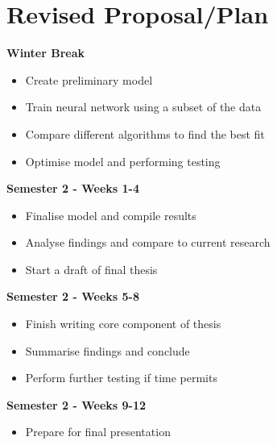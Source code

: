 \documentclass[12pt,twocolumn]{article}
\begin{document}
	\section{Revised Proposal/Plan}
		\textbf{Winter Break}
		\begin{itemize}
			\item Create preliminary model
			\item Train neural network using a subset of the data
			\item Compare different algorithms to find the best fit
			\item Optimise model and performing testing
		\end{itemize}
		\textbf{Semester 2 - Weeks 1-4}
		\begin{itemize}
			\item Finalise model and compile results
			\item Analyse findings and compare to current research
			\item Start a draft of final thesis
		\end{itemize}
		\textbf{Semester 2 - Weeks 5-8}
		\begin{itemize}
			\item Finish writing core component of thesis
			\item Summarise findings and conclude
			\item Perform further testing if time permits
		\end{itemize}
		\textbf{Semester 2 - Weeks 9-12}
		\begin{itemize}
			\item Prepare for final presentation
		\end{itemize}
\end{document}
